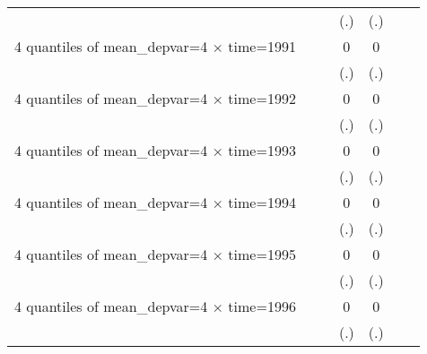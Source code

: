 \begin{table}[htbp]
\begin{tabular}{l*{6}{c}}
                    &                     &                     &         (.)         &         (.)         &                     &                     \\
[1em]
4 quantiles of mean\_depvar=4 $\times$ time=1991&                     &                     &           0         &           0         &                     &                     \\
                    &                     &                     &         (.)         &         (.)         &                     &                     \\
[1em]
4 quantiles of mean\_depvar=4 $\times$ time=1992&                     &                     &           0         &           0         &                     &                     \\
                    &                     &                     &         (.)         &         (.)         &                     &                     \\
[1em]
4 quantiles of mean\_depvar=4 $\times$ time=1993&                     &                     &           0         &           0         &                     &                     \\
                    &                     &                     &         (.)         &         (.)         &                     &                     \\
[1em]
4 quantiles of mean\_depvar=4 $\times$ time=1994&                     &                     &           0         &           0         &                     &                     \\
                    &                     &                     &         (.)         &         (.)         &                     &                     \\
[1em]
4 quantiles of mean\_depvar=4 $\times$ time=1995&                     &                     &           0         &           0         &                     &                     \\
                    &                     &                     &         (.)         &         (.)         &                     &                     \\
[1em]
4 quantiles of mean\_depvar=4 $\times$ time=1996&                     &                     &           0         &           0         &                     &                     \\
                    &                     &                     &         (.)         &         (.)         &                     &                     \\

\end{tabular}
\end{table}
